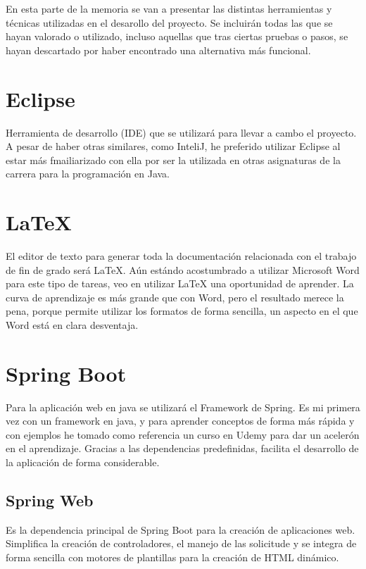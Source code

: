 

En esta parte de la memoria se van a presentar las distintas herramientas y técnicas utilizadas en el desarollo del proyecto.
Se incluirán todas las que se hayan valorado o utilizado, incluso aquellas que tras ciertas pruebas o pasos, se hayan descartado por haber encontrado una alternativa más funcional.

\section{Eclipse}

Herramienta de desarrollo (IDE) que se utilizará para llevar a cambo el proyecto.
A pesar de haber otras similares, como InteliJ, he preferido utilizar Eclipse al estar más fmailiarizado con ella por ser la utilizada en otras asignaturas de la carrera para la programación en Java.

\section{LaTeX}
El editor de texto para generar toda la documentación relacionada con el trabajo de fin de grado será LaTeX.
Aún estándo acostumbrado a utilizar Microsoft Word para este tipo de tareas, veo en utilizar LaTeX una oportunidad de aprender.
La curva de aprendizaje es más grande que con Word, pero el resultado merece la pena, porque permite utilizar los formatos de forma sencilla, un aspecto en el que Word está en clara desventaja.
\section{Spring Boot}

Para la aplicación web en java se utilizará el Framework de Spring.
Es mi primera vez con un framework en java, y para aprender conceptos de forma más rápida y con ejemplos he tomado como referencia un curso en Udemy \cite{udemy:eliseo} para dar un acelerón en el aprendizaje.
Gracias a las dependencias predefinidas, facilita el desarrollo de la aplicación de forma considerable.

\subsection{Spring Web}

Es la dependencia principal de Spring Boot para la creación de aplicaciones web. 
Simplifica la creación de controladores, el manejo de las solicitude y se integra de forma sencilla con motores de plantillas para la creación de HTML dinámico.


